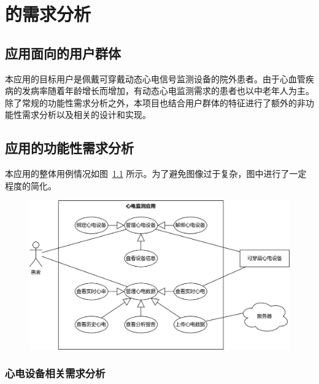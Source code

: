 

\chapter{\app 的需求分析}\label{ch:req}


\section{应用面向的用户群体}\label{sec:target-user}

本应用的目标用户是佩戴可穿戴动态心电信号监测设备的院外患者。由于心血管疾病的发病率随着年龄增长而增加\cite{Zhongguoxinxieguanjiankangyujibingbaogao20212022}，有动态心电监测需求的患者也以中老年人为主。除了常规的功能性需求分析之外，本项目也结合用户群体的特征进行了额外的非功能性需求分析以及相关的设计和实现。


\section{应用的功能性需求分析}\label{sec:func-req}

本应用的整体用例情况如图~\ref{fig:use-case} 所示。为了避免图像过于复杂，图中进行了一定程度的简化。

\begin{figure}[!ht]
    \includegraphics[width=\textwidth]{../assets/use-case.drawio}
    \label{fig:use-case}
\end{figure}

\subsection{心电设备相关需求分析}\label{subsec:device-req}

